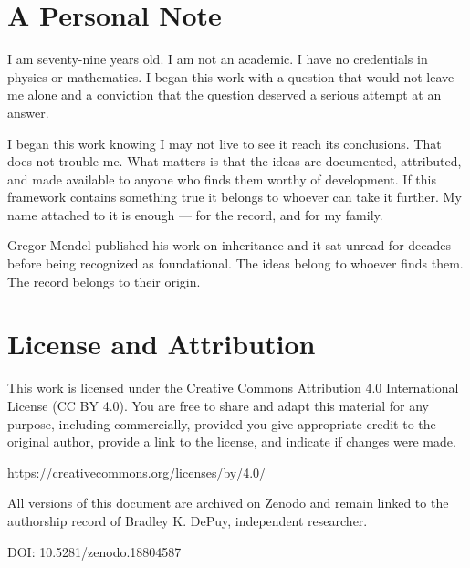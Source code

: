 \documentclass[11pt,letterpaper]{article}
\begin{document}
\section{A Personal Note}
\label{sec:org32b9c00}

I am seventy-nine years old. I am not an academic. I have no credentials in physics or mathematics. I began this work with a question that would not leave me alone and a conviction that the question deserved a serious attempt at an answer.

I began this work knowing I may not live to see it reach its conclusions. That does not trouble me. What matters is that the ideas are documented, attributed, and made available to anyone who finds them worthy of development. If this framework contains something true it belongs to whoever can take it further. My name attached to it is enough --- for the record, and for my family.

Gregor Mendel published his work on inheritance and it sat unread for decades before being recognized as foundational. The ideas belong to whoever finds them. The record belongs to their origin.
\section{License and Attribution}
\label{sec:orged6bbf3}

This work is licensed under the Creative Commons Attribution 4.0 International License (CC BY 4.0). You are free to share and adapt this material for any purpose, including commercially, provided you give appropriate credit to the original author, provide a link to the license, and indicate if changes were made.

\url{https://creativecommons.org/licenses/by/4.0/}

All versions of this document are archived on Zenodo and remain linked to the authorship record of Bradley K. DePuy, independent researcher.

DOI: 10.5281/zenodo.18804587
\end{document}

